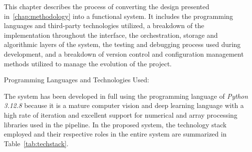 
This chapter describes the process of converting the design presented in~\cref{chap:methodology} into a functional system. It includes the programming languages and third-party technologies utilized, a breakdown of the implementation throughout the interface, the orchestration, storage and algorithmic layers of the system, the testing and debugging process used during development, and a breakdown of version control and configuration management methods utilized to manage the evolution of the project.

Programming Languages and Technologies Used:

The system has been developed in full using the programming language of \textit{Python 3.12.8} because it is a mature computer vision and deep learning language with a high rate of iteration and excellent support for numerical and array processing libraries used in the pipeline. In the proposed system, the technology stack employed and their respective roles in the entire system are summarized in Table~\ref{tab:techstack}.



